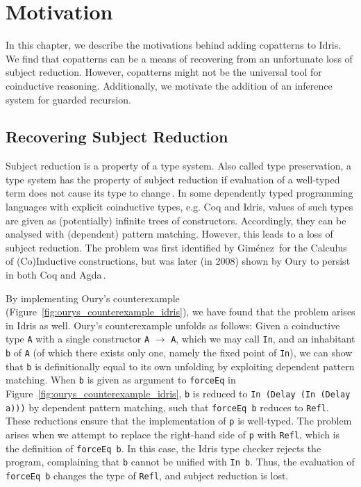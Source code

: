 
\chapter{Motivation}
\label{cha:motivation}
In this chapter, we describe the motivations behind adding copatterns to
Idris. We find that copatterns can be a means of recovering from an unfortunate
loss of subject reduction. However, copatterns might not be the universal tool
for coinductive reasoning. Additionally, we motivate the addition of an
inference system for guarded recursion.

\section{Recovering Subject Reduction}
\label{sec:recov-subj-reduct}

Subject reduction is a property of a type system. Also called type preservation,
a type system has the property of subject reduction if evaluation of a
well-typed term does not cause its type to change\,\citep[Section~8.3.3]{Pierce:2002:TPL:509043}.
In some dependently typed programming languages with explicit coinductive types,
e.g. Coq and Idris, values of such types are given as (potentially) infinite
trees of constructors. Accordingly, they can be analysed with (dependent)
pattern matching. However, this leads to a loss of subject reduction. The
problem was first identified by Gim\'{e}nez\,\citep{Gimenez96uncalcul} for the
Calculus of (Co)Inductive constructions, but was later (in 2008) shown by Oury
to persist in both Coq and
Agda\,\citep{OuryCounterexampleCoq,OuryCounterexampleAgda}.

By implementing Oury's counterexample
(Figure~\ref{fig:ourys_counterexample_idris}), we have found that the problem
arises in Idris as well. Oury's counterexample unfolds as follows: Given a
coinductive type \texttt{A} with a single constructor \texttt{A} $\to$ \texttt{A}, which we may call
\texttt{In}, and an inhabitant \texttt{b} of \texttt{A} (of which there exists only one,
namely the fixed point of \texttt{In}), we can show that \texttt{b} is definitionally
equal to its own unfolding by exploiting dependent pattern matching. When
\texttt{b} is given as argument to \texttt{forceEq} in
Figure~\ref{fig:ourys_counterexample_idris}, \texttt{b} is reduced to \texttt{In
  (Delay (In (Delay a)))} by dependent pattern matching, such that \texttt{forceEq b}
reduces to \texttt{Refl}. These reductions ensure that the implementation of
\texttt{p} is well-typed. The problem arises when we attempt to replace the
right-hand side of \texttt{p} with \texttt{Refl}, which is the definition of
\texttt{forceEq b}. In this case, the Idris type checker rejects the program,
complaining that \texttt{b} cannot be unified with \texttt{In b}. Thus, the
evaluation of \texttt{forceEq b} changes the type of \texttt{Refl}, and subject
reduction is lost.

